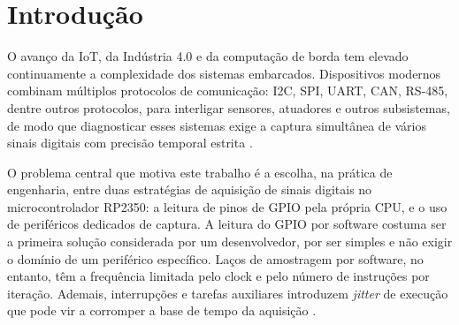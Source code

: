 \chapter{Introdução}\label{cap:introducao}

O avanço da \ac{IoT}, da Indústria 4.0 e da computação de borda tem elevado
continuamente a complexidade dos sistemas embarcados. Dispositivos modernos
combinam múltiplos protocolos de comunicação: \ac{I2C}, \ac{SPI}, \ac{UART},
\ac{CAN}, RS-485, dentre outros protocolos, para interligar sensores, atuadores
e outros subsistemas, de modo que diagnosticar esses sistemas exige a captura
simultânea de vários sinais digitais com precisão temporal estrita
\cite{gis2021}.

O problema central que motiva este trabalho é a escolha, na prática de
engenharia, entre duas estratégias de aquisição de sinais digitais no
microcontrolador RP2350: a leitura de pinos de \ac{GPIO} pela
própria \ac{CPU}, e o uso de periféricos dedicados de captura. A leitura do
\ac{GPIO} por software costuma ser a primeira solução considerada por um
desenvolvedor, por ser simples e não exigir o domínio de um periférico
específico. Laços de amostragem por software, no entanto, têm a frequência
limitada pelo clock e pelo número de instruções por iteração. Ademais,
interrupções e tarefas auxiliares introduzem \emph{jitter} de execução que pode
vir a corromper a base de tempo da aquisição \cite{gis2021,hui2023,regehr2005}.

